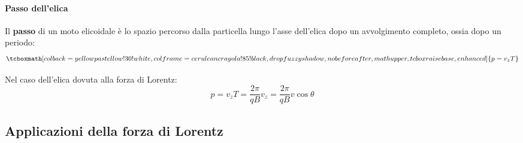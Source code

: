 \paragraph{Passo dell'elica}
\begin{define}
	Il \textbf{passo} di un moto elicoidale  è lo spazio percorso dalla particella lungo l'asse dell'elica dopo un avvolgimento completo, ossia dopo un periodo:
	\begin{equation}
		\tcboxmath[colback=yellowpastellow!30!white,colframe=ceruleancrayola!85!black,drop fuzzy shadow, nobeforeafter, math upper, tcbox raise base, enhanced]{p=v_zT}
	\end{equation}
\end{define}
Nel caso dell'elica dovuta alla forza di Lorentz:
\begin{equation}
	p=v_zT=\frac{2\pi}{qB}v_z=\frac{2\pi}{qB}v\cos\theta
\end{equation}
\subsection{Applicazioni della forza di Lorentz}
